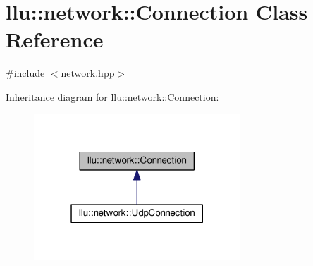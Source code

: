 \hypertarget{classllu_1_1network_1_1_connection}{\section{llu\+:\+:network\+:\+:Connection Class Reference}
\label{classllu_1_1network_1_1_connection}
}


{\ttfamily \#include $<$network.\+hpp$>$}



Inheritance diagram for llu\+:\+:network\+:\+:Connection\+:
\nopagebreak
\begin{figure}[H]
\begin{center}
\leavevmode
\includegraphics[width=220pt]{classllu_1_1network_1_1_connection__inherit__graph}
\end{center}
\end{figure}

